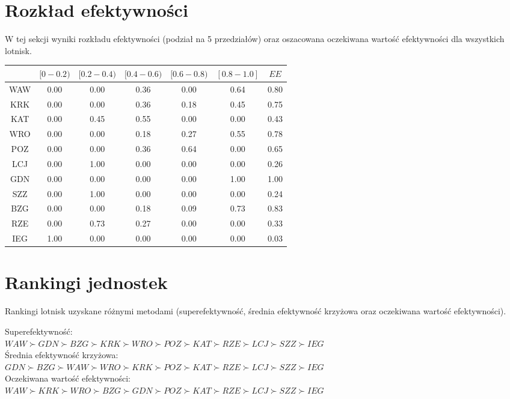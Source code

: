 \documentclass[a4paper,12pt]{article}
\begin{document}
\section{Rozkład efektywności}
W tej sekcji wyniki rozkładu efektywności (podział na 5 przedziałów) oraz oszacowana oczekiwana wartość efektywności dla wszystkich lotnisk.
\begin{table}[H]
\begin{tabular}{c|ccccc|c}
\hline
    & $[0-0.2)$ & $[0.2-0.4)$ & $[0.4-0.6)$ & $[0.6-0.8)$ & $[0.8-1.0]$ & $EE$    \\ \hline
WAW & 0.00 & 0.00 & 0.36 & 0.00 & 0.64 & 0.80 \\
KRK & 0.00 & 0.00 & 0.36 & 0.18 & 0.45 & 0.75 \\
KAT & 0.00 & 0.45 & 0.55 & 0.00 & 0.00 & 0.43 \\
WRO & 0.00 & 0.00 & 0.18 & 0.27 & 0.55 & 0.78 \\
POZ & 0.00 & 0.00 & 0.36 & 0.64 & 0.00 & 0.65 \\
LCJ & 0.00 & 1.00 & 0.00 & 0.00 & 0.00 & 0.26 \\
GDN & 0.00 & 0.00 & 0.00 & 0.00 & 1.00 & 1.00 \\
SZZ & 0.00 & 1.00 & 0.00 & 0.00 & 0.00 & 0.24 \\
BZG & 0.00 & 0.00 & 0.18 & 0.09 & 0.73 & 0.83 \\
RZE & 0.00 & 0.73 & 0.27 & 0.00 & 0.00 & 0.33 \\
IEG & 1.00 & 0.00 & 0.00 & 0.00 & 0.00 & 0.03 \\
\hline
\end{tabular}
\label{tab:efficiency-distribution}
\end{table}

\section{Rankingi jednostek}
Rankingi lotnisk uzyskane różnymi metodami (superefektywność, średnia efektywność krzyżowa oraz oczekiwana wartość efektywności).

\noindent Superefektywność:\\
$WAW \succ GDN \succ BZG \succ KRK \succ WRO \succ POZ \succ KAT \succ RZE \succ LCJ \succ SZZ \succ IEG$ \\
Średnia efektywność krzyżowa:\\
$GDN \succ BZG \succ WAW \succ WRO \succ KRK \succ POZ \succ KAT \succ RZE \succ LCJ \succ SZZ \succ IEG$ \\
Oczekiwana wartość efektywności:\\
$WAW \succ KRK \succ WRO \succ BZG \succ GDN \succ POZ \succ KAT \succ RZE \succ LCJ \succ SZZ \succ IEG$ \\
\end{document}
